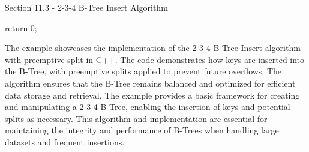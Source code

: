 \begin{notes}{Section 11.3 - 2-3-4 B-Tree Insert Algorithm}
\begin{highlight}
\begin{code}[C++]
{        return 0;
    }
    \end{code}
        The example showcases the implementation of the 2-3-4 B-Tree Insert algorithm with preemptive split in C++. The code demonstrates how keys are inserted into the B-Tree, with preemptive splits applied to prevent future overflows. The algorithm ensures that the B-Tree remains balanced and optimized for efficient data storage 
        and retrieval. The example provides a basic framework for creating and manipulating a 2-3-4 B-Tree, enabling the insertion of keys and potential splits as necessary. This algorithm and implementation are essential for maintaining the integrity and performance of B-Trees when handling large datasets and frequent insertions.
    \end{highlight}
\end{notes}

